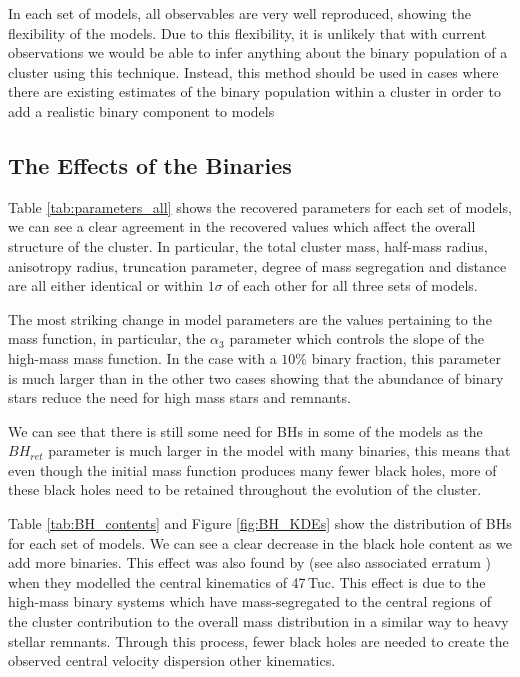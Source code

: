 In each set of models, all observables are very well reproduced, showing the flexibility of the
 models. Due to this flexibility, it is unlikely that with current observations we
would be able to infer anything about the binary population of a cluster using this technique.
Instead, this method should be used in cases where there are existing estimates of the binary
population within a cluster in order to add a realistic binary component to  models



\subsection{The Effects of the Binaries}


Table \ref{tab:parameters_all} shows the recovered parameters for each set of models, we can see a
clear agreement in the recovered values which affect the overall structure of the cluster. In
particular, the total cluster mass, half-mass radius, anisotropy radius, truncation parameter,
degree of mass segregation and distance are all either identical or within $1\sigma$ of each other
for all three sets of models.



The most striking change in model parameters are the values pertaining to the mass function, in
particular, the $\alpha_3$ parameter which controls the slope of the high-mass mass function. In the
case with a $10\%$ binary fraction, this parameter is much larger than in the other two cases
showing that the abundance of binary stars reduce the need for high mass stars and remnants.

We can see that there is still some need for BHs in some of the models as the $BH_{ret}$ parameter
is much larger in the model with many binaries, this means that even though the initial mass
function produces many fewer black holes, more of these black holes need to be retained throughout
the evolution of the cluster.

Table \ref{tab:BH_contents} and Figure \ref{fig:BH_KDEs} show the distribution of BHs for each set
of models. We can see a clear decrease in the black hole content as we add more binaries. This
effect was also found by \citet{Mann2019} (see also associated erratum \citealt{Mann2020}) when they
modelled the central kinematics of 47\,Tuc. This effect is due to the high-mass binary systems which
have mass-segregated to the central regions of the cluster contribution to the overall mass
distribution in a similar way to heavy stellar remnants. Through this process, fewer black holes are
needed to create the observed central velocity dispersion other kinematics.


